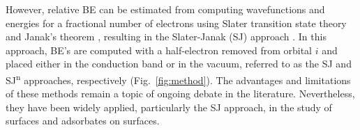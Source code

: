 \documentclass[%
aip,
amsmath,amssymb,
preprint,%
jcp,
showkeys,
]{revtex4-2}
\begin{document}
However, relative BE can be estimated from computing wavefunctions and energies for a fractional number of electrons using Slater transition state theory and Janak's theorem \cite{janakProofThatFrac1978}, resulting in the Slater-Janak (SJ) approach \cite{hiraoImprovedSlaterTransition2021}. In this approach, BE's are computed with a half-electron removed from orbital $i$ and placed either in the conduction band or in the vacuum, referred to as the SJ and SJ\textsuperscript{n} approaches\cite{pueyobellafontPredictingCoreLevel2017}, respectively (Fig.~\ref{fig:method}). The advantages and limitations of these methods remain a topic of ongoing debate in the literature\cite{olovssonCorelevelShiftsComplex2006,taucherFinalStateSimulationsCoreLevel2020}. Nevertheless, they have been widely applied, particularly the SJ approach, in the study of surfaces\cite{olovssonFirstPrincipleCalculations2010,bagusRevisitingSurfaceCorelevel2019,bagusXrayPhotoelectronSpectroscopy2024} and adsorbates on surfaces\cite{babyAnchoringBendingPentacene2015,salvarezzaExploringCoreLevel2015,fujimoriInteractionWaterCaO2016a,taucherFinalStateSimulationsCoreLevel2020}.
\end{document}
